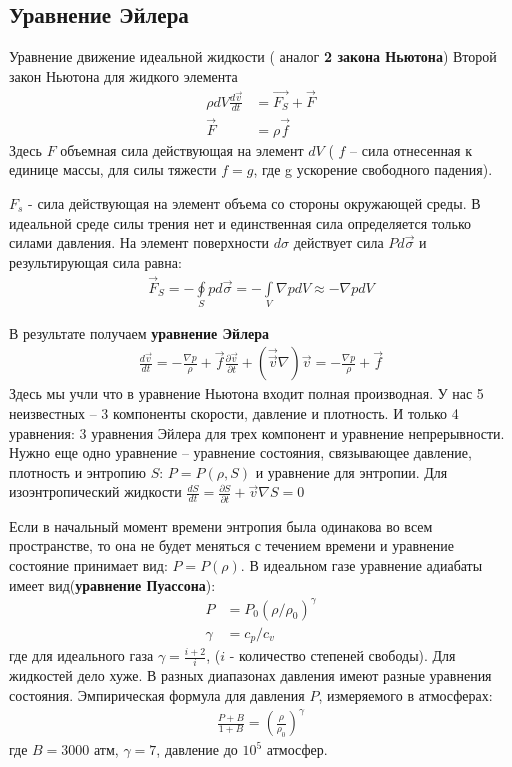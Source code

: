 \subsection{Уравнение Эйлера}
Уравнение движение идеальной жидкости ( аналог \textbf{2 закона Ньютона})
Второй закон Ньютона для жидкого элемента
\begin{align*}
\rho d V \frac{d \vec{v}}{d t} &=\vec{F_{S}}+\vec{F} \\
\vec { F } &= \rho \vec { f }
\end{align*}
Здесь $F$ объемная сила действующая на элемент $dV$ ( $f$ – сила отнесенная к единице массы, для силы тяжести $f=g$, где g ускорение свободного падения).

$F_s$ - сила действующая на элемент объема со стороны окружающей среды.  В идеальной среде силы трения нет и единственная сила определяется только силами давления. На элемент поверхности $d\sigma$ действует сила $ P d \vec { \sigma } $ и результирующая сила равна:
\begin{align*}
\vec { F } _ { S } = - \oint \limits_ { S } p d \vec { \sigma } = - \int \limits_ { V } \nabla p d V \approx - \nabla p d V
\end{align*}

В результате получаем \textbf{уравнение Эйлера}
\begin{align*}
\frac { d \vec { v } } { d t } = - \frac { \nabla p } { \rho } + \vec { f }
\frac { \partial \vec { v } } { \partial t } + ( \vec { \vec{v} } \nabla ) \vec { v } = - \frac { \nabla p } { \rho } + \vec { f }
\end{align*}
Здесь мы учли что в уравнение Ньютона входит полная производная. У нас  5 неизвестных – 3 компоненты скорости, давление и плотность. И только 4 уравнения: 3 уравнения Эйлера для трех компонент и уравнение непрерывности.
Нужно еще одно уравнение – уравнение состояния, связывающее давление, плотность и энтропию $S$: $ P = P ( \rho , S ) $ и уравнение для энтропии. Для изоэнтропический жидкости $ \frac { d S } { d t } = \frac { \partial S } { \partial t } + \vec { v } \nabla S = 0 $

Если в начальный момент времени энтропия была одинакова во всем пространстве, то она не будет меняться с течением времени и уравнение состояние принимает вид: $ P = P ( \rho ) $.
В идеальном газе уравнение адиабаты имеет вид(\textbf{уравнение Пуассона}):
\begin{align*}
P &= P _ { 0 } \left( \rho / \rho _ { 0 } \right) ^ { \gamma } \\
\gamma &= c _ { p } / c _ { v }
\end{align*}
где для идеального газа $\gamma = \frac{i+2}{i}$, ($i$ - количество степеней свободы).
Для жидкостей дело хуже. В разных диапазонах давления имеют разные уравнения состояния. Эмпирическая формула для давления $P$, измеряемого в атмосферах: 
\begin{align*}
\frac { P + B } { 1 + B } = \left( \frac { \rho } { \rho _ { 0 } } \right) ^ { \gamma }
\end{align*}
где $B=3000\text{ атм}$, $\gamma = 7$, давление до $10^5$ атмосфер.

